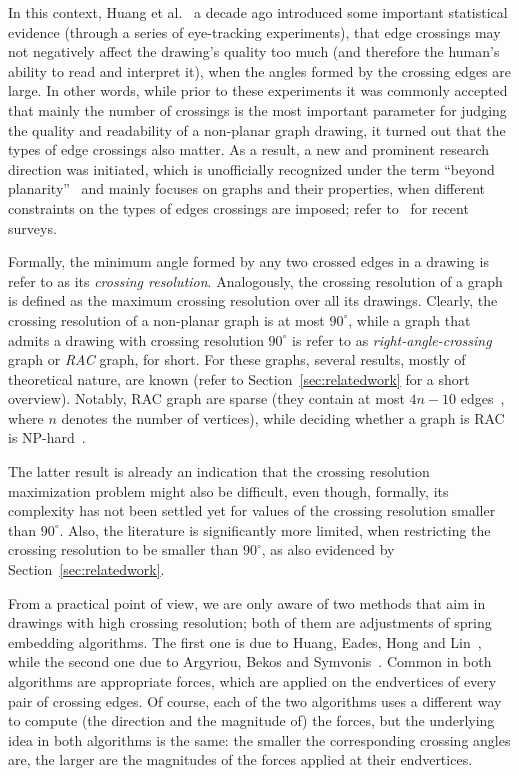 \documentclass{llncs}
\begin{document}
In this context, Huang et al.~\cite{DBLP:conf/apvis/Huang07,DBLP:journals/vlc/HuangEH14} a decade ago introduced some important statistical evidence (through a series of eye-tracking experiments), that edge crossings may not negatively affect the drawing's quality too much (and therefore the human's ability to read and interpret it), when the angles formed by the crossing edges are large. In other words, while prior to these experiments it was commonly accepted that mainly the number of crossings is the most important parameter for judging the quality and readability of a non-planar graph drawing, it turned out that the types of edge crossings also matter. As a result, a new and prominent research direction was initiated, which is unofficially recognized under the term ``beyond planarity''~\cite{Shonan2016,Dagstuhl2016,SoCG2017} and mainly focuses on graphs and their properties, when different constraints on the types of edges crossings are imposed; refer to~\cite{DBLP:journals/jgaa/BekosKM18,DBLP:journals/corr/abs-1804-07257} for recent surveys. 

Formally, the minimum angle formed by any two crossed edges in a drawing is refer to as its \emph{crossing resolution}. Analogously, the crossing resolution of a graph is defined as the maximum crossing resolution over all its drawings. Clearly, the crossing resolution of a non-planar graph is at most $90^\circ$, while a graph that admits a drawing with crossing resolution $90^\circ$ is refer to as \emph{right-angle-crossing} graph or \emph{RAC} graph, for short. For these graphs, several results, mostly of theoretical nature, are known (refer to Section~\ref{sec:relatedwork} for a short overview). Notably, RAC graph are sparse (they contain at most $4n-10$ edges~\cite{DBLP:journals/tcs/DidimoEL11}, where $n$ denotes the number of  vertices), while deciding whether a graph is RAC is NP-hard~\cite{DBLP:journals/jgaa/ArgyriouBS12}. 

The latter result is already an indication that the crossing resolution maximization problem might also be difficult, even though, formally, its complexity has not been settled yet for values of the crossing resolution smaller than $90^\circ$. Also, the literature is significantly more limited, when restricting the crossing resolution to be smaller than $90^\circ$, as also evidenced by Section~\ref{sec:relatedwork}. 

From a practical point of view, we are only aware of two methods that aim in drawings with high crossing resolution; both of them are adjustments of spring embedding algorithms. The first one is due to Huang, Eades, Hong and Lin~\cite{DBLP:journals/vlc/HuangEHL13}, while the second one due to Argyriou, Bekos and Symvonis~\cite{DBLP:journals/cj/ArgyriouBS13}. Common in both algorithms are appropriate forces, which are applied on the endvertices of every pair of crossing edges. Of course, each of the two algorithms uses a different way to compute (the direction and the magnitude of) the forces, but the underlying idea in both algorithms is the same: the smaller the corresponding crossing angles are, the larger are the magnitudes of the forces applied at their endvertices. 
\end{document}

